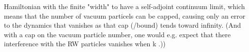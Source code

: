 \documentclass{report}
\begin{document}
Hamiltonian with the finite "width" to have a self-adjoint continuum limit, which means that the number of vacuum particels can be capped, causing only an error to the dynamics that vanishes as that cap (/bound) tends toward infinity. (And with a cap on the vacuum particle number, one would e.g. expect that there interference with the RW particles vanishes when \delta k .))
\end{document}
